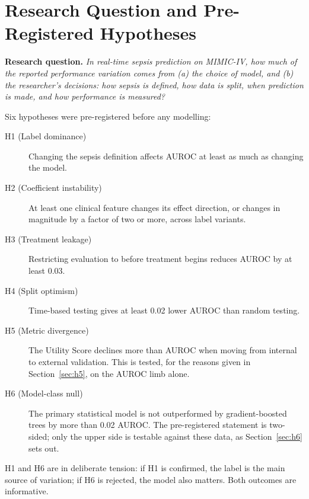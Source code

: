 \section{Research Question and Pre-Registered Hypotheses}
\label{sec:rq}

\noindent\textbf{Research question.} \textit{In real-time sepsis prediction on
MIMIC-IV, how much of the reported performance variation comes from (a) the
choice of model, and (b) the researcher's decisions: how sepsis is defined,
    how data is split, when prediction is made, and how performance is measured?}

Six hypotheses were pre-registered before any modelling:

\begin{description}
    \item[H1 (Label dominance)] Changing the sepsis definition affects AUROC at
    least as much as changing the model.
    \item[H2 (Coefficient instability)] At least one clinical feature changes its
    effect direction, or changes in magnitude by a factor of two or more, across
    label variants.
    \item[H3 (Treatment leakage)] Restricting evaluation to before treatment
    begins reduces AUROC by at least 0.03.
    \item[H4 (Split optimism)] Time-based testing gives at least 0.02 lower AUROC
    than random testing.
    \item[H5 (Metric divergence)] The Utility Score declines more than AUROC when
    moving from internal to external validation. This is tested, for the reasons
    given in Section~\ref{sec:h5}, on the AUROC limb alone.
    \item[H6 (Model-class null)] The primary statistical model is not
    outperformed by gradient-boosted trees by more than 0.02 AUROC. The
    pre-registered statement is two-sided; only the upper side is testable
    against these data, as Section~\ref{sec:h6} sets out.
\end{description}

H1 and H6 are in deliberate tension: if H1 is confirmed, the label is the main
source of variation; if H6 is rejected, the model also matters. Both outcomes
are informative.

